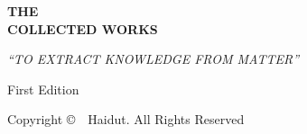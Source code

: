 \begin{fullwidth}

\begin{center}
{\fontsize{14pt}{18pt}\selectfont{}}

\vspace*{8\baselineskip}

{\fontsize{36pt}{40pt}\selectfont\textbf{THE}}\\[12pt]
{\fontsize{36pt}{40pt}\selectfont\textbf{COLLECTED WORKS}}

\vspace*{3\baselineskip}

{\fontsize{14pt}{18pt}\selectfont\textit{\enquote{TO EXTRACT KNOWLEDGE FROM MATTER}}}

\vspace*{4\baselineskip}

{\fontsize{18pt}{22pt}\selectfont\textbf{\covervolume}}

\vspace*{1\baselineskip}

{\fontsize{14pt}{18pt}\selectfont\coveryear}

\vspace*{1\baselineskip}

{\fontsize{12pt}{16pt}\selectfont First Edition}

\vfill

{\footnotesize Copyright \copyright\ \coveryear\ Haidut. All Rights Reserved}

\end{center}

\end{fullwidth}